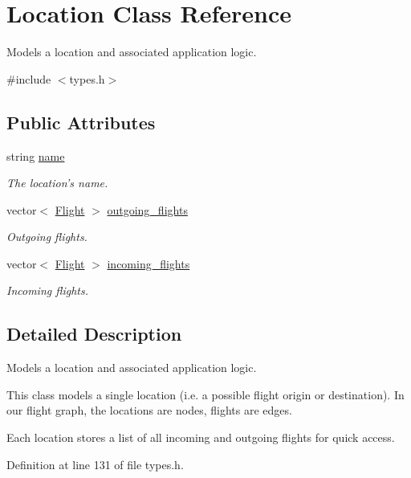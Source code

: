 \hypertarget{class_location}{\section{Location Class Reference}
\label{class_location}
}


Models a location and associated application logic.  




{\ttfamily \#include $<$types.\-h$>$}

\subsection*{Public Attributes}
\begin{DoxyCompactItemize}
\item 
string \hyperlink{class_location_a0ae46c7127ec349e484ed075c91ba258}{name}
\begin{DoxyCompactList}\small\item\em The location's name. \end{DoxyCompactList}\item 
vector$<$ \hyperlink{struct_flight}{Flight} $>$ \hyperlink{class_location_ace927068b1af49e5519844c15668e789}{outgoing\-\_\-flights}
\begin{DoxyCompactList}\small\item\em Outgoing flights. \end{DoxyCompactList}\item 
vector$<$ \hyperlink{struct_flight}{Flight} $>$ \hyperlink{class_location_ac43a0eca7e83b95962344c04b43494ab}{incoming\-\_\-flights}
\begin{DoxyCompactList}\small\item\em Incoming flights. \end{DoxyCompactList}\end{DoxyCompactItemize}


\subsection{Detailed Description}
Models a location and associated application logic. 

This class models a single location (i.\-e. a possible flight origin or destination). In our flight graph, the locations are nodes, flights are edges.

Each location stores a list of all incoming and outgoing flights for quick access. 

Definition at line 131 of file types.\-h.



